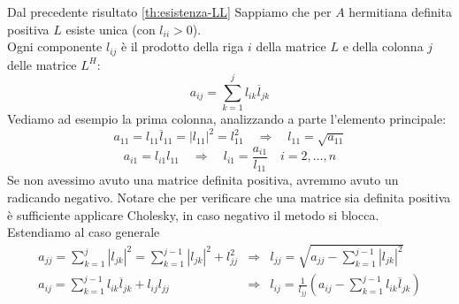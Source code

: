 Dal precedente risultato \ref{th:esistenza-LL} Sappiamo che per $A$
hermitiana definita positiva $L$ esiste unica (con $l_{ii} > 0 $).\\
Ogni componente $l_{ij}$ è il prodotto della riga $i$ della matrice
$L$ e della colonna $j$ delle matrice $L^H$:
$$ a_{ij} = \displaystyle \sum_{k=1}^{j} l_{ik} \overline{l}_{jk} $$
Vediamo ad esempio la prima colonna, analizzando a parte l'elemento principale:
$$ a_{11} = l_{11} \overline{l}_{11} =  |l_{11}|^{2} = l_{11}^{2} 
\quad \Longrightarrow \quad
l_{11} = \sqrt{a_{11}} $$
$$ a_{i1} = l_{i1} l_{11} 
\quad \Longrightarrow \quad
l_{i1} = \frac{a_{i1}}{l_{11}} \quad i = 2, \ldots, n $$
Se non avessimo avuto una matrice definita positiva, avremmo avuto un
radicando negativo. Notare che per verificare che una matrice sia
definita positiva \`e sufficiente applicare Cholesky, in caso negativo
il metodo si blocca.\\
Estendiamo al caso generale
\[\begin{array}{lll}
a_{jj} = \displaystyle \sum_{k=1}^{j} |l_{jk}|^2 = 
\displaystyle \sum_{k=1}^{j-1} |l_{jk}|^{2} + l_{jj}^{2}
& \Longrightarrow &
l_{jj} = \sqrt{a_{jj} - \displaystyle \sum_{k=1}^{j-1} |l_{jk}|^{2}}
\\
a_{ij} = \displaystyle  \sum_{k=1}^{j-1} l_{ik} \overline{l}_{jk} +  l_{ij} l_{jj}
& \Longrightarrow &
l_{ij} = \frac{1}{l_{jj}}(a_{ij} - \displaystyle \sum_{k=1}^{j-1} l_{ik} \overline l_{jk})
\end{array}\]

